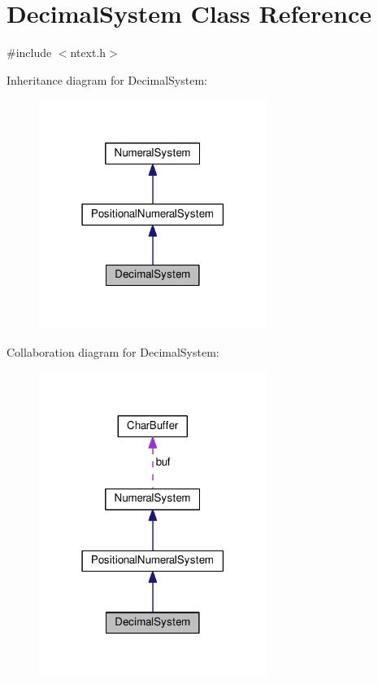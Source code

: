 \hypertarget{classDecimalSystem}{}\section{Decimal\+System Class Reference}
\label{classDecimalSystem}


{\ttfamily \#include $<$ntext.\+h$>$}



Inheritance diagram for Decimal\+System\+:
\nopagebreak
\begin{figure}[H]
\begin{center}
\leavevmode
\includegraphics[width=210pt]{d6/d81/classDecimalSystem__inherit__graph}
\end{center}
\end{figure}


Collaboration diagram for Decimal\+System\+:
\nopagebreak
\begin{figure}[H]
\begin{center}
\leavevmode
\includegraphics[width=210pt]{d7/dfc/classDecimalSystem__coll__graph}
\end{center}
\end{figure}
